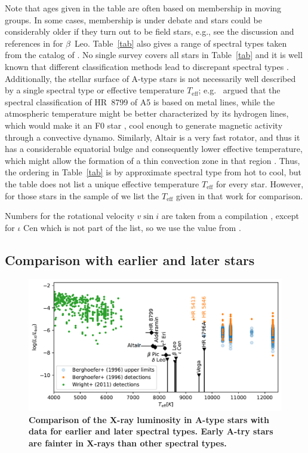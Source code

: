 \documentclass[preprint2]{aastex631}
\begin{document}
Note that ages given in the table are often based on membership in moving groups. In some cases, membership is under debate and stars could be considerably older if they turn out to be field stars, e.g., see the discussion and references in \citet{2021AJ....161..186D} for $\beta$~Leo. Table~\ref{tab} also gives a range of spectral types taken from the catalog of \citet[][see there for a full list of spectral type references]{2014yCat....1.2023S}. 
No single survey covers all stars in Table~\ref{tab} and it is well known that different classification methods lead to discrepant spectral types  \citep[e.g.,][]{1989ApJS...70..623G}.
Additionally, the stellar surface of A-type stars is not necessarily well described by a single spectral type or effective temperature $T_\mathrm{eff}$; e.g.\ \citet{2010A&A...516A..38R} argued that the
spectral classification of HR~8799 of A5 is based on metal lines,
while the atmospheric temperature might be better characterized by its
hydrogen lines, which would make it an F0 star
\citep{1999AJ....118.2993G}, cool enough to generate magnetic activity
through a convective dynamo. Similarly,  Altair is a very fast rotator, and thus it has a considerable equatorial bulge and consequently lower effective temperature, which might allow the formation of a thin convection zone in that region \citep{2009A&A...497..511R}. Thus, the ordering in Table~\ref{tab} is by approximate spectral type from hot to cool, but the table does not list a unique effective temperature $T_\mathrm{eff}$ for every star. However, for those stars in the sample of \citet{2002ApJ...579..800S} we list the $T_\mathrm{eff}$ given in that work for comparison.

Numbers for the rotational velocity $v \sin i$ are taken from a compilation \citep{2002A&A...393..897R}, except for $\iota$ Cen which is not part of the list, so we use the value from \cite{2002ApJ...579..800S}.

\subsection{Comparison with earlier and later stars}
\begin{figure}
    \centering
    \includegraphics[width=\textwidth]{figures/lxlbol.pdf}
    \caption{\textbf{Comparison of the X-ray luminosity in A-type stars with data for earlier and later spectral types. Early A-try stars are fainter in X-rays than other spectral types.}
    \label{fig:lxlbol}}
\end{figure}
\end{document}
